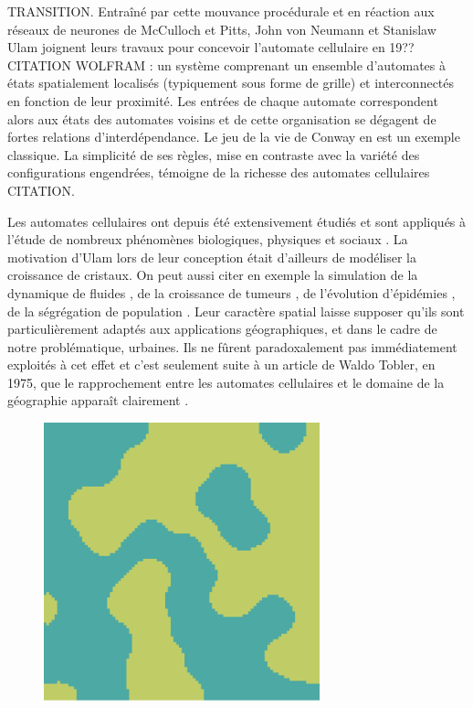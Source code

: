 \documentclass[12pt]{article}
\begin{document}
TRANSITION. Entraîné par cette mouvance procédurale et en réaction aux
réseaux de neurones de McCulloch et Pitts, John von Neumann et
Stanislaw Ulam joignent leurs travaux pour concevoir l'automate
cellulaire en 19??  CITATION WOLFRAM : un système comprenant un
ensemble d'automates à états spatialement localisés (typiquement sous
forme de grille) et interconnectés en fonction de leur proximité. Les
entrées de chaque automate correspondent alors aux états des automates
voisins et de cette organisation se dégagent de fortes relations
d'interdépendance. Le jeu de la vie de Conway en est un exemple
classique. La simplicité de ses règles, mise en contraste avec la
variété des configurations engendrées, témoigne de la richesse des
automates cellulaires CITATION.

Les automates cellulaires ont depuis été extensivement étudiés et sont
appliqués à l'étude de nombreux phénomènes biologiques, physiques et
sociaux \cite{Ganguly2003}. La motivation d'Ulam lors de leur conception
était d'ailleurs de modéliser la croissance de cristaux. On peut aussi
citer en exemple la simulation de la dynamique de fluides
\cite{Frisch1986}, de la croissance de tumeurs \cite{Kansal2000}, de
l'évolution d'épidémies \cite{Fu2003}, de la ségrégation de population
\cite{Schelling1969}. Leur caractère spatial laisse supposer qu'ils
sont particulièrement adaptés aux applications géographiques, et dans
le cadre de notre problématique, urbaines. Ils ne fûrent
paradoxalement pas immédiatement exploités à cet effet et c'est
seulement suite à un article de Waldo Tobler, en 1975, que le
rapprochement entre les automates cellulaires et le domaine de la
géographie apparaît clairement \cite{Tobler1975}.

\begin{figure}
  \centering
  \includegraphics[width=8cm]{images/schelling.png}
  \caption{}
  \label{fig:schelling}
\end{figure}
\end{document}
